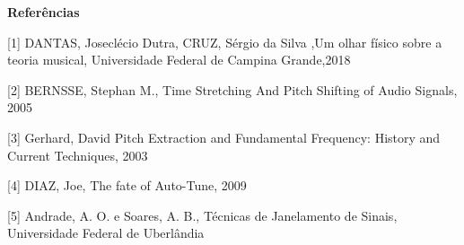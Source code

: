 \begin{center}
	\Large \textbf{Referências}
\end{center}
	
[1] DANTAS, Joseclécio Dutra, CRUZ, Sérgio da Silva ,Um olhar físico sobre a teoria musical, Universidade Federal de Campina Grande,2018

[2] BERNSSE, Stephan M., Time Stretching And Pitch Shifting of Audio Signals, 2005
	
[3] Gerhard, David Pitch Extraction and Fundamental Frequency: History and Current Techniques, 2003
	
[4] DIAZ, Joe, The fate of Auto-Tune, 2009

[5] Andrade, A. O. e Soares, A. B., Técnicas de Janelamento de Sinais, Universidade Federal de Uberlândia
	
	
	

